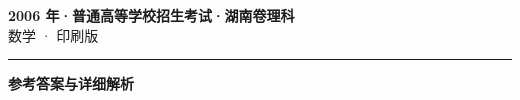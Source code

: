 \documentclass[zihao=5, a4paper]{ctexart}
\begin{document}
\begin{center}
  {\Large\bfseries 2006 年·普通高等学校招生考试·湖南卷理科}\\[4pt]
  {\large 数学 · 印刷版}
\end{center}
\medskip
{}

\par\bigskip\hrule\bigskip
{}
\begin{center}{\large\bfseries 参考答案与详细解析}\end{center}
\smallskip

\end{document}
